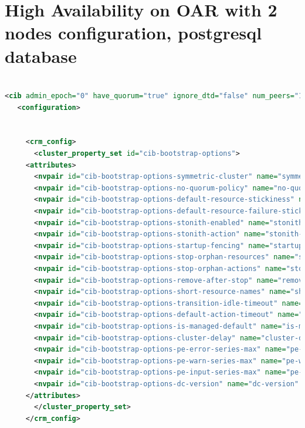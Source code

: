 \documentclass[a4paper,10pt]{report}
\begin{document}
\section {High Availability on OAR with 2 nodes configuration, postgresql database}
\begin{lstlisting}[language=xml]

<cib admin_epoch="0" have_quorum="true" ignore_dtd="false" num_peers="1" cib_feature_revision="2.0" generated="false" epoch="4" num_updates="4" cib-last-written="Mon Jul 20 15:22:44 2009" ccm_transition="1">
   <configuration>
   
   
     <crm_config>
       <cluster_property_set id="cib-bootstrap-options">
	 <attributes>
	   <nvpair id="cib-bootstrap-options-symmetric-cluster" name="symmetric-cluster" value="true"/>
	   <nvpair id="cib-bootstrap-options-no-quorum-policy" name="no-quorum-policy" value="stop"/>
	   <nvpair id="cib-bootstrap-options-default-resource-stickiness" name="default-resource-stickiness" value="0"/>
	   <nvpair id="cib-bootstrap-options-default-resource-failure-stickiness" name="default-resource-failure-stickiness" value="0"/>
	   <nvpair id="cib-bootstrap-options-stonith-enabled" name="stonith-enabled" value="false"/>
	   <nvpair id="cib-bootstrap-options-stonith-action" name="stonith-action" value="reboot"/>
	   <nvpair id="cib-bootstrap-options-startup-fencing" name="startup-fencing" value="true"/>
	   <nvpair id="cib-bootstrap-options-stop-orphan-resources" name="stop-orphan-resources" value="true"/>
	   <nvpair id="cib-bootstrap-options-stop-orphan-actions" name="stop-orphan-actions" value="true"/>
	   <nvpair id="cib-bootstrap-options-remove-after-stop" name="remove-after-stop" value="false"/>
	   <nvpair id="cib-bootstrap-options-short-resource-names" name="short-resource-names" value="true"/>
	   <nvpair id="cib-bootstrap-options-transition-idle-timeout" name="transition-idle-timeout" value="5min"/>
	   <nvpair id="cib-bootstrap-options-default-action-timeout" name="default-action-timeout" value="20s"/>
	   <nvpair id="cib-bootstrap-options-is-managed-default" name="is-managed-default" value="true"/>
	   <nvpair id="cib-bootstrap-options-cluster-delay" name="cluster-delay" value="60s"/>
	   <nvpair id="cib-bootstrap-options-pe-error-series-max" name="pe-error-series-max" value="-1"/>
	   <nvpair id="cib-bootstrap-options-pe-warn-series-max" name="pe-warn-series-max" value="-1"/>
	   <nvpair id="cib-bootstrap-options-pe-input-series-max" name="pe-input-series-max" value="-1"/>
	   <nvpair id="cib-bootstrap-options-dc-version" name="dc-version" value="2.1.3-node: 552305612591183b1628baa5bc6e903e0f1e26a3"/>
	 </attributes>
       </cluster_property_set>
     </crm_config>
     

\end{lstlisting}
\end{document}
